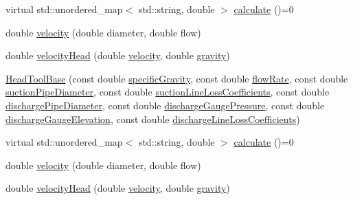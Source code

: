 \begin{DoxyCompactItemize}
\item 
virtual std\+::unordered\+\_\+map$<$ std\+::string, double $>$ \hyperlink{class_head_tool_base_ab8df8f908827ce45dc5e769ea0e10f0b}{calculate} ()=0
\item 
double \hyperlink{class_head_tool_base_a0412306c4adda62e5840342b0d26ac06}{velocity} (double diameter, double flow)
\item 
double \hyperlink{class_head_tool_base_a461c3d53a92763ca08c9a5bbcbef83c3}{velocity\+Head} (double \hyperlink{class_head_tool_base_a0412306c4adda62e5840342b0d26ac06}{velocity}, double \hyperlink{class_head_tool_base_a687da90a9c2f44cb51061d9fad30c002}{gravity})
\item 
\hyperlink{class_head_tool_base_ae5bb2325e1266c64b16937d964aea14f}{Head\+Tool\+Base} (const double \hyperlink{class_head_tool_base_ae5af2380fb5db2c25281ef663a5fb65f}{specific\+Gravity}, const double \hyperlink{class_head_tool_base_acf4c03cb62cbf63aba017ce063989fbc}{flow\+Rate}, const double \hyperlink{class_head_tool_base_a357365fc5ef346ce7bcb089c9d1a95e1}{suction\+Pipe\+Diameter}, const double \hyperlink{class_head_tool_base_ac74c6f6f8ab387efe7b77e0ce6ecd84e}{suction\+Line\+Loss\+Coefficients}, const double \hyperlink{class_head_tool_base_a126a397bd3d87b68864e1962c70bb45e}{discharge\+Pipe\+Diameter}, const double \hyperlink{class_head_tool_base_a39c854f13b16967e02a67cd1aaee07c4}{discharge\+Gauge\+Pressure}, const double \hyperlink{class_head_tool_base_a9ed2160992f8da2e335d919cf9aedd08}{discharge\+Gauge\+Elevation}, const double \hyperlink{class_head_tool_base_a147c035c7422406c594c5fd42ab11eb0}{discharge\+Line\+Loss\+Coefficients})
\item 
virtual std\+::unordered\+\_\+map$<$ std\+::string, double $>$ \hyperlink{class_head_tool_base_ab8df8f908827ce45dc5e769ea0e10f0b}{calculate} ()=0
\item 
double \hyperlink{class_head_tool_base_a0412306c4adda62e5840342b0d26ac06}{velocity} (double diameter, double flow)
\item 
double \hyperlink{class_head_tool_base_a461c3d53a92763ca08c9a5bbcbef83c3}{velocity\+Head} (double \hyperlink{class_head_tool_base_a0412306c4adda62e5840342b0d26ac06}{velocity}, double \hyperlink{class_head_tool_base_a687da90a9c2f44cb51061d9fad30c002}{gravity})
\end{DoxyCompactItemize}
